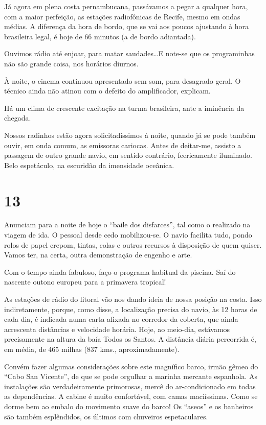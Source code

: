 Já agora em plena costa pernambucana, passávamos a pegar a qualquer hora, com a maior perfeição, as estações radiofônicas de Recife, mesmo em ondas médias. A diferença da hora de bordo, que se vai aos poucos ajustando à hora brasileira legal, é hoje de 66 minutos (a de bordo adiantada).

Ouvimos rádio até enjoar, para matar saudades\ldots E note-se que os programinhas não são grande coisa, nos horários diurnos.

À noite, o cinema continuou apresentado sem som, para desagrado geral. O técnico ainda não atinou com o defeito do amplificador, explicam.

Há um clima de crescente excitação na turma brasileira, ante a iminência da chegada.

Nossos radinhos estão agora solicitadíssimos à noite, quando já se pode também ouvir, em onda comum, as emissoras cariocas. Antes de deitar-me, assisto a passagem de outro grande navio, em sentido contrário, feericamente iluminado. Belo espetáculo, na escuridão da imensidade oceânica.

\section*{13 \adfflatleafright {}}
Anunciam para a noite de hoje o “baile dos disfarces”, tal como o realizado na viagem de ida. O pessoal desde cedo mobilizou-se. O navio facilita tudo, pondo rolos de papel crepom, tintas, colas e outros recursos à disposição de quem quiser. Vamos ter, na certa, outra demonstração de engenho e arte.

Com o tempo ainda fabuloso, faço o programa habitual da piscina. Saí do nascente outono europeu para a primavera tropical!

As estações de rádio do litoral vão nos dando ideia de nossa posição na costa. Isso indiretamente, porque, como disse, a localização precisa do navio, às 12 horas de cada dia, é indicada numa carta afixada no corredor da coberta, que ainda acrescenta distâncias e velocidade horária. Hoje, ao meio-dia, estávamos precisamente na altura da baía Todos os Santos. A distância diária percorrida é, em média, de 465 milhas (837 kms., aproximadamente).

Convém fazer algumas considerações sobre este magnífico barco, irmão gêmeo do “Cabo San Vicente”, de que se pode orgulhar a marinha mercante espanhola. As instalações são verdadeiramente primorosas, mercê do ar-condicionado em todas as dependências. A cabine é muito confortável, com camas maciíssimas. Como se dorme bem ao embalo do movimento suave do barco! Os “aseos” e os banheiros são também esplêndidos, os últimos com chuveiros espetaculares.

